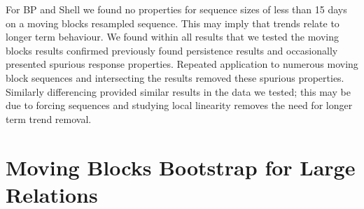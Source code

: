 \smallskip

 For BP and Shell we found no properties for sequence
sizes of less than 15 days on a moving blocks resampled sequence. This
may imply that trends relate to longer term behaviour.
We
found within all results that we tested the moving blocks results
confirmed previously found persistence results and occasionally
presented spurious response properties. Repeated application to
numerous moving block sequences and intersecting the results removed
these spurious properties. Similarly differencing provided similar
results in the data we tested; this may be due to forcing sequences
and studying local linearity removes the need for longer term trend
removal.


\section{Moving Blocks Bootstrap for Large Relations}\label{sec:mbb_large}



